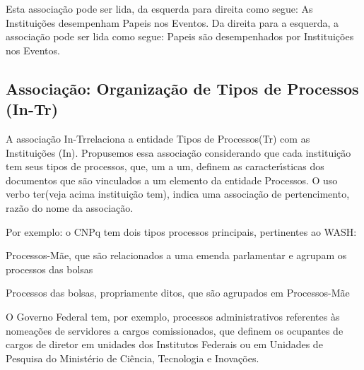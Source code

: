 \documentclass[
12pt,		%
openright,	%
twoside,  %
a4paper,			%
chapter=TITLE,		%
english,			%
french,				%
spanish,			%
brazil				%
]{USPSC-classe/USPSC}
\begin{document}
Esta associa\c{c}\~ao pode ser lida, da esquerda para direita como segue: \textquotedbl As Institui\c{c}\~oes desempenham Papeis nos Eventos\textquotedbl . Da direita para a esquerda, a associa\c{c}\~ao pode ser lida como segue: \textquotedbl Papeis s\~ao desempenhados por Institui\c{c}\~oes nos Eventos\textquotedbl .




\subsection[Associa\c{c}\~ao: Organiza\c{c}\~ao de Tipos de Processos (In-Tr)]{Associa\c{c}\~ao: Organiza\c{c}\~ao de Tipos de Processos (In-Tr)}\label{Associa\c{c}\~ao: Organiza\c{c}\~ao de Tipos de Processos (In-Tr)}
A associa\c{c}\~ao \textquotedbl In-Tr\textquotedbl  relaciona a entidade \textquotedbl Tipos de Processos\textquotedbl  (Tr) com as Institui\c{c}\~oes (In). Propusemos essa associa\c{c}\~ao considerando que cada institui\c{c}\~ao tem seus tipos de processos, que, um a um, definem as caracter\'{\i}sticas dos documentos que s\~ao vinculados a um elemento da entidade \textquotedbl Processos\textquotedbl . O uso verbo \textquotedbl ter\textquotedbl  (veja acima \textquotedbl institui\c{c}\~ao tem\textquotedbl ), indica uma associa\c{c}\~ao de pertencimento, raz\~ao do nome da associa\c{c}\~ao.




Por exemplo: o CNPq tem dois tipos processos principais, pertinentes ao WASH:





\begin{alineas}
\item Processos-M\~ae, que s\~ao relacionados a uma emenda parlamentar e agrupam os processos das bolsas
\item Processos das bolsas, propriamente ditos, que s\~ao agrupados em Processos-M\~ae
\end{alineas}

O Governo Federal tem, por exemplo, processos administrativos referentes \`as nomea\c{c}\~oes de servidores a cargos comissionados, que definem os ocupantes de cargos de diretor em unidades dos Institutos Federais ou em Unidades de Pesquisa do Minist\'erio de Ci\^encia, Tecnologia e Inova\c{c}\~oes.





\end{document}
